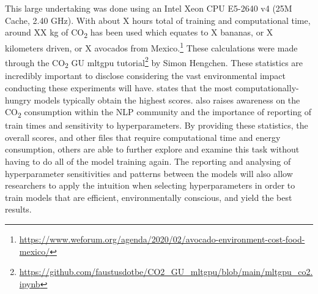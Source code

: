 This large undertaking was done using an Intel Xeon CPU E5-2640 v4 (25M Cache, 2.40 GHz). With about X hours total of training and computational time, around XX kg of CO\textsubscript{2} has been used which equates to X bananas, or X kilometers driven, or X avocados from Mexico.\footnote{\url{https://www.weforum.org/agenda/2020/02/avocado-environment-cost-food-mexico/}} These calculations were made through the CO\textsubscript{2} GU mltgpu tutorial\footnote{\url{https://github.com/faustusdotbe/CO2_GU_mltgpu/blob/main/mltgpu_co2.ipynb}} by Simon Hengchen. These statistics are incredibly important to disclose considering the vast environmental impact conducting these experiments will have. 
\citet{strubell-etal-2019-energy} states that the most computationally-hungry models typically obtain the highest scores. \citet{strubell-etal-2019-energy} also raises awareness on the CO\textsubscript{2} consumption within the NLP community and the importance of reporting of train times and sensitivity to hyperparameters. By providing these statistics, the overall scores, and other files that require computational time and energy consumption, others are able to  further explore and examine this task without having to do all of the model training again. The reporting and analysing of hyperparameter sensitivities and patterns between the models will also allow researchers to apply the intuition when selecting hyperparameters in order to train models that are efficient, environmentally conscious, and yield the best results.

